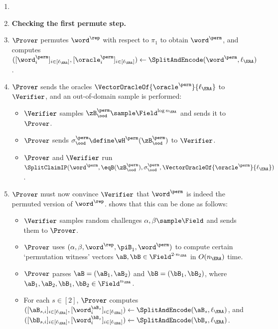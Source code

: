 \begin{tcolorbox}[breakable, enhanced, colback=white, boxrule=0.65pt]
\begin{enumerate}[nolistsep]
        \item[] \item[] \textbf{Checking the first permute step.} 
        \item $\Prover$ permutes $\word^{\rep}$ with respect to $\pi_1$ to obtain $\word^{\perm}$, and computes $([\word^{\perm}_i]_{i \in [\ell_{\ERA}]}, [\oracle^{\perm}_i]_{i \in [\ell_{\ERA}]}) \gets \SplitAndEncode(\word^{\perm}, \ell_{\ERA})$.
        \item $\Prover$ sends the oracles $\VectorOracleOf{\oracle^{\perm}}{\ell_{\ERA}}$ to $\Verifier$, and an out-of-domain sample is performed:
        \begin{itemize}[nolistsep]
            \item $\Verifier$ samples $\zB^{\perm}_{\ood} \sample \Field^{\log n_{\ERA}}$ and sends it to $\Prover$.
            \item $\Prover$ sends $\sigma^{\perm}_{\ood} \define \wH^{\perm}(\zB^{\perm}_{\ood})$ to $\Verifier$.
            \item $\Prover$ and $\Verifier$ run $\SplitClaimIP(\word^{\perm}, \eqB(\zB^{\perm}_{\ood}), \sigma^{\perm}_{\ood}, \VectorOracleOf{\oracle^{\perm}}{\ell_{\ERA}})$.
        \end{itemize}
        \item $\Prover$ must now convince $\Verifier$ that $\word^{\perm}$ is indeed the permuted version of $\word^{\rep}$. \cite[Section 3.5]{ChenBBZ23} shows that this can be done as follows:
        \label{item:codeswitch-claims-permutation-challenge}
        \begin{itemize}[nolistsep]
            \item $\Verifier$ samples random challenges $\alpha, \beta \sample \Field$ and sends them to $\Prover$.
            \item $\Prover$ uses $(\alpha, \beta, \word^{\rep}, \piB_1, \word^{\perm})$ to compute certain `permutation witness' vectors $\aB, \bB \in \Field^{2 \cdot n_{\ERA}}$ in $O(n_{\ERA})$ time.
            \item $\Prover$ parses $\aB = (\aB_1, \aB_2)$ and $\bB = (\bB_1, \bB_2)$, where $\aB_1, \aB_2, \bB_1, \bB_2 \in \Field^{n_{\ERA}}$.
            \item For each $s \in [2]$, $\Prover$ computes $([\aB_{s,i}]_{i \in [\ell_{\ERA}]}, [\word^{\aB_s}_i]_{i \in [\ell_{\ERA}]}) \gets \SplitAndEncode(\aB_s, \ell_{\ERA})$, and $([\bB_{s,i}]_{i \in [\ell_{\ERA}]}, [\word^{\bB_s}_i]_{i \in [\ell_{\ERA}]}) \gets \SplitAndEncode(\bB_s, \ell_{\ERA})$.

\end{itemize}
\end{enumerate}
\end{tcolorbox}
